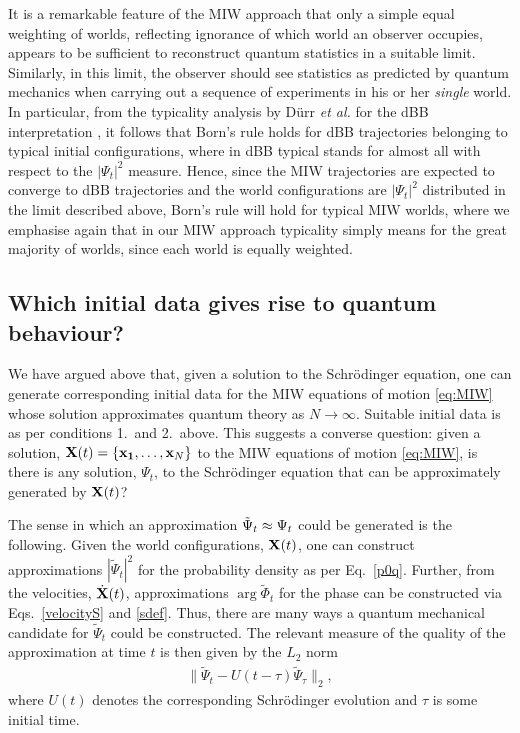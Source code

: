 \documentclass[twocolumn,aps,pra,amsmath,amssymb,superscriptaddress]{revtex4}
\newcommand{\cu}[1]{\left\{ {#1} \right\}}
\renewcommand{\(}{\left(}
\renewcommand{\)}{\right)}
\newcommand{\red}{\color{red}}
\newcommand{\blk}{\color{black}}
\newcommand{\blu}{\color{blue}}
\newcommand{\grn}{\color{ngreen}}
\renewcommand\grn{\blk}
\renewcommand\blu{\blk}
\renewcommand\red{\blk}
\begin{document}
It is a remarkable feature of the MIW approach that only a simple equal
weighting of worlds, reflecting ignorance of which world an observer occupies,
appears to be sufficient to reconstruct quantum statistics in \blu a \blk suitable
limit.  Similarly, in this limit, the observer should see statistics as
predicted by quantum mechanics when carrying out a sequence of experiments in
his or her {\it single} world.  In particular, from the typicality
    analysis by D\"urr {\it et al.} for the dBB interpretation
    \cite{quantumequilibrium}, it follows that Born's rule holds for dBB
    trajectories belonging \blu to \blk typical initial configurations, where in dBB
    typical stands for almost all with respect to the $|\Psi_t|^2$ measure.  Hence,
    since the MIW trajectories are expected to converge to dBB trajectories and
    the world configurations are $|\Psi_t|^2$ distributed in the limit
    described above, Born's rule will hold for typical MIW worlds, where we
    emphasise again that in our MIW approach typicality simply means for the
    great majority of worlds, since each world is equally weighted.

\blu
\subsection{Which initial data gives rise to quantum behaviour?}

 We \grn have argued \blu above \grn that, given a solution to the Schr\"odinger equation,  one
can generate \grn corresponding initial data  for \grn the MIW equations of motion
\eqref{eq:MIW} whose solution approximates quantum theory as $N\to\infty$. Suitable \grn initial data   is as per \grn
conditions 1.~and 2.~above.
\red This suggests a converse question: \grn given a solution, \red ${\bf X}(t)=\cu{{\bf x_1}, \ldots , {\bf x}_N}$ 
\grn to the MIW equations of motion
\eqref{eq:MIW}, \red is \grn there is any solution, $\Psi_t$, to the Schr\"odinger
equation that can be approximately  generated \red by ${\bf X}(t)$? 

The sense in which an  \blu approximation $\tilde{\Psi}_t \red \approx \Psi_t$ \red could be  generated \red is the following. 
\grn Given the world configurations, ${\bf X}(t)$, one can \blu construct approximations  $|\tilde{\Psi}_t|^2$ for the probability density 
 as per \grn Eq.~\eqref{p0q}.    Further, from \grn the velocities, \red $\dot {\bf X}(t)$, \blk 
 approximations $\arg \tilde \Phi_t$ for the phase can be constructed via  \grn  Eqs.~\eqref{velocityS} \blu and \grn \eqref{sdef}.   Thus, \red 
there are many ways a quantum
mechanical candidate for $\tilde{\Psi}_t$ could \grn be constructed.  The relevant measure of
the quality of the approximation at time $t$ is then given by the $L_2$ norm
\begin{align}
    \label{eq:MIW_QM_approx} \|\tilde{\Psi}_t-U(t-\tau)\tilde{\Psi}_\tau\|_2,
\end{align}
where $U(t)$ denotes the corresponding Schr\"odinger evolution and $\tau$ is
some initial time. \blk
\end{document}
